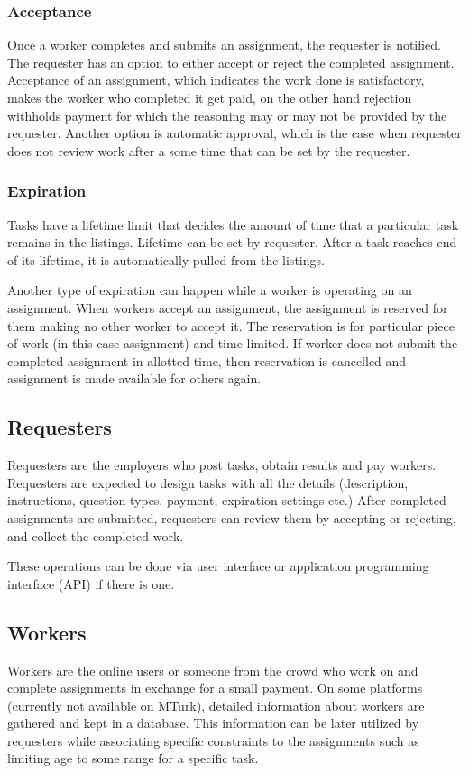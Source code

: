 \subsubsection{Acceptance}
Once a worker completes and submits an assignment, the requester is notified. 
The requester has an option to either accept or reject the completed assignment. 
Acceptance of an assignment, which indicates the work done is satisfactory, 
makes the worker who completed it get paid, on the other hand rejection withholds 
payment for which the reasoning may or may not be provided by the requester. 
Another option is automatic approval, which is the case when requester does not 
review work after a some time that can be set by the requester.

\subsubsection{Expiration}
Tasks have a lifetime limit that decides the amount of time that a particular task 
remains in the listings. Lifetime can be set by requester. After a task reaches 
end of its lifetime, it is automatically pulled from the listings.

Another type of expiration can happen while a worker is operating on an assignment. 
When workers accept an assignment, the assignment is reserved for them making 
no other worker to accept it. The reservation is for particular piece of work 
(in this case assignment) and time-limited. If worker does not submit the completed 
assignment in allotted time, then reservation is cancelled and assignment is 
made available for others again.

\subsection{Requesters}
Requesters are the employers who post tasks, obtain results and pay workers. 
Requesters are expected to design tasks with all the details (description, instructions, 
question types, payment, expiration settings etc.) After completed assignments 
are submitted, requesters can review them by accepting or rejecting, 
and collect the completed work. 

These operations can be done via user interface or application programming 
interface (API) if there is one. 

\subsection{Workers}
Workers are the online users or someone from the crowd who work on and 
complete assignments in exchange for a small payment. On some platforms 
(currently not available on MTurk), detailed information about workers are gathered 
and kept in a database. This information can be later utilized by requesters while 
associating specific constraints to the assignments such as limiting age to some 
range for a specific task. 




